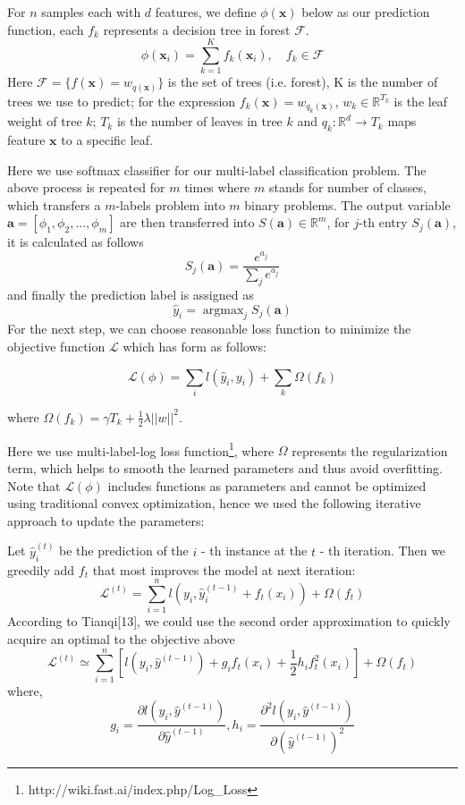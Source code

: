 \documentclass[letterpaper]{article}
\begin{document}
For $n$ samples each with $d$ features, we define $\phi(\bm{x})$ below as our prediction function, each $f_k$ represents a decision tree in forest $\mathcal{F}$.
$$
\phi(\bm{x}_{i}) = \sum_{k = 1}^{K} f_{k}(\bm{x}_{i}),\quad f_{k} \in \mathcal{F}
$$
Here $\mathcal{F} = \{ f(\bm{x}) = w_{q(\bm{x})} \}$ is the set of trees (i.e. forest), K is the number of trees we use to predict; for the expression $f_{k}(\bm{x})=w_{q_{k}(\bm{x})}$, $w_{k}\in \mathbb{R}^{T_{k}}$ is the leaf weight of tree $k$; $T_{k}$ is the number of leaves in tree $k$ and $q_{k}: \mathbb{R}^d \rightarrow T_{k}$ maps feature $\bm{x}$ to a specific leaf.

Here we use softmax classifier for our multi-label classification problem. The above process is repeated for $m$ times where $m$ stands for number of classes, which transfers a $m$-labels problem into $m$ binary problems. The output variable $\bm{a}=[\phi_{1},\phi_{2},...,\phi_{m}]$ are then transferred into $S(\bm{a})\in\mathbb{R}^{m}$, for $j$-th entry $S_{j}(\bm{a})$, it is calculated as follows
$$
S_{j}(\bm{a}) = \frac{e^{a_{j}}}{\sum_{j}e^{a_{j}}}
$$
and finally the prediction label is assigned as
$$
\hat{y}_{i}=\mathop{\arg\max}_{j} S_{j}(\bm{a})
$$
For the next step, we can choose reasonable loss function to minimize the objective function $\mathcal{L}$ which has form as follows:

$$
\mathcal{L}(\phi) = \sum_{i} l(\hat y_i, y_i) + \sum_{k} \Omega(f_k)
$$

where $\Omega(f_{k}) = \gamma T_{k} + \frac{1}{2}\lambda ||w||^{2}$.

Here we use multi-label-log loss function\footnote{ http://wiki.fast.ai/index.php/Log\_Loss}, where $\Omega$ represents the regularization term, which helps to smooth the learned parameters and thus avoid overfitting. Note that $\mathcal{L}(\phi)$ includes functions as parameters and cannot be optimized using traditional convex optimization, hence we used the following iterative approach to update the parameters:

Let $\hat{y}_{i}^{(t)}$ be the prediction of the $i$ - th instance at the $t$ - th iteration. Then we greedily add $f_t$ that most improves the model at next iteration:
$$
\mathcal{L}^{(t)} = \sum_{i = 1}^nl(y_{i}, \hat{y}_{i}^{(t-1)} + f_{t}(x_i)) + \Omega(f_{t})
$$
According to Tianqi[13], we could use the second order approximation to quickly acquire an optimal to the objective above
$$
\mathcal{L}^{(t)} \simeq\sum_{i = 1}^n[l(y_i, \hat{y}^{(t-1)}) + g_if_t(x_i) + \frac{1}{2}h_if_t^2(x_i)] + \Omega(f_t)
$$
where, 
$$
g_i=\frac{\partial l(y_i, \hat{y}^{(t-1)})}{\partial\hat{y}^{(t-1)}},
h_i=\frac{\partial^2 l(y_i, \hat{y}^{(t-1)})}{\partial(\hat{y}^{(t-1)})^{2}}$$
\end{document}
